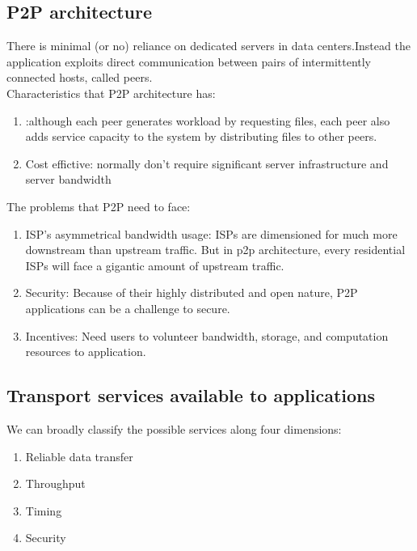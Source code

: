 \subsection{P2P architecture}

There is minimal (or no) reliance on dedicated servers in
data centers.Instead the application exploits direct communication between pairs of
intermittently connected hosts, called peers.\\

Characteristics that P2P architecture has:
\begin{enumerate}
    \item {}:although each peer generates
          workload by requesting files, each peer also adds service capacity to the system
          by distributing files to other peers.
    \item Cost effictive: normally don’t require significant server infrastructure and server bandwidth
\end{enumerate}

The problems that P2P need to face:
\begin{enumerate}
    \item ISP's asymmetrical bandwidth usage: ISPs are dimensioned for much more downstream than upstream traffic. But in p2p architecture, every residential ISPs will face a gigantic amount of upstream traffic.
    \item Security: Because of their highly distributed and open nature, P2P applications can be a challenge to secure.
    \item Incentives: Need users to volunteer bandwidth, storage, and computation resources to application.
\end{enumerate}

\subsection{Transport services available to applications}

\hf We can broadly classify the possible services along four dimensions:
\begin{enumerate}
    \item Reliable data transfer
    \item Throughput
    \item Timing
    \item Security
\end{enumerate}


\newpage

